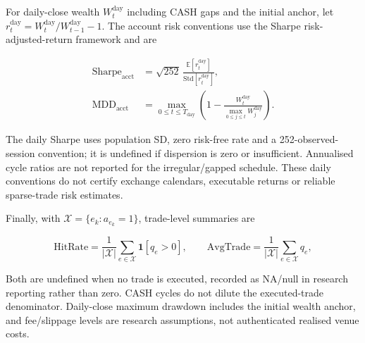 For daily-close wealth $W^{\mathrm{day}}_t$ including CASH gaps and the initial anchor, let $r^{\mathrm{day}}_t=W^{\mathrm{day}}_t/W^{\mathrm{day}}_{t-1}-1$. The account risk conventions use the Sharpe risk-adjusted-return framework \cite{sharpe1966mutual} and are

\begin{align}
    \mathrm{Sharpe}_{\mathrm{acct}}
    &=\sqrt{252}\,\frac{\mathbb{E}[r^{\mathrm{day}}_t]}
    {\mathrm{Std}[r^{\mathrm{day}}_t]},
    \label{eq:account_sharpe}\\[4pt]
    \mathrm{MDD}_{\mathrm{acct}}
    &=\max_{0\le t\le T_{\mathrm{day}}}
      \left(1-\frac{W^{\mathrm{day}}_t}{\max_{0\le j\le t}W^{\mathrm{day}}_j}\right).
    \label{eq:account_mdd}
\end{align}


The daily Sharpe uses population SD, zero risk-free rate and a 252-observed-session convention; it is undefined if dispersion is zero or insufficient. Annualised cycle ratios are not reported for the irregular/gapped schedule. These daily conventions do not certify exchange calendars, executable returns or reliable sparse-trade risk estimates.

Finally, with $\mathcal{X}=\{e_k:a_{e_k}=1\}$, trade-level summaries are

\begin{equation}
    \mathrm{HitRate}=\frac{1}{|\mathcal{X}|}
    \sum_{e\in\mathcal{X}}\mathbf{1}[q_e>0],\qquad
    \mathrm{AvgTrade}=\frac{1}{|\mathcal{X}|}
    \sum_{e\in\mathcal{X}}q_e,
    \label{eq:account_trade_metrics}
\end{equation}


Both are undefined when no trade is executed, recorded as NA/null in research reporting rather than zero. CASH cycles do not dilute the executed-trade denominator. Daily-close maximum drawdown includes the initial wealth anchor, and fee/slippage levels are research assumptions, not authenticated realised venue costs.
